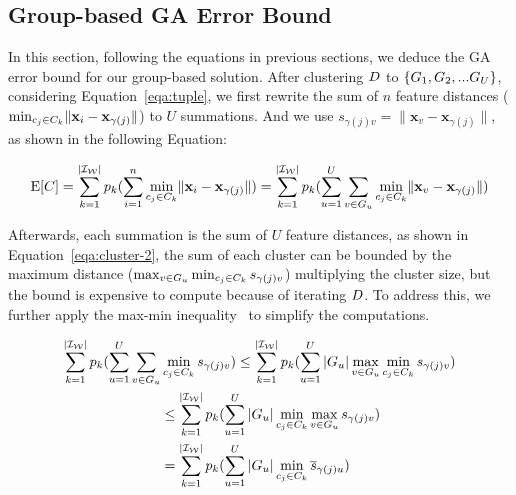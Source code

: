 




\subsection{Group-based GA Error Bound}
\label{group-ea}

In this section, following the equations in previous sections, we deduce the GA error bound for our group-based solution. 
%
After clustering $D$ to $\{ G_1 , G_2, ...G_U\}$, considering Equation~\ref{eqa:tuple}, we  first rewrite the sum of $n$ feature distances (\ie $\min_{c_j\in C_k}\lVert\mathbf{x}_i - \mathbf{x}_{\gamma(j)}\rVert$) to $U$ summations. And we use $s_{\gamma(j)v} = \lVert\mathbf{x}_v - \mathbf{x}_{\gamma(j)}\rVert$, as shown in the following Equation:

\begin{equation}\label{eqa:cluster-1}
    \mathrm{E}[C] = \sum_{k= 1}^{|\mathcal{I_W}|} p_k (\sum_{i=1}^n \min_{c_j\in C_k}\lVert\mathbf{x}_i - \mathbf{x}_{\gamma(j)}\rVert) =  \sum_{k= 1}^{|\mathcal{I_W}|} p_k (\sum_{u=1}^U\sum_{v \in G_u} \min_{c_j\in C_k}\lVert\mathbf{x}_v - \mathbf{x}_{\gamma(j)}\rVert)
\end{equation}

Afterwards, each summation is the sum of $U$ feature distances, as shown in Equation~\ref{eqa:cluster-2},  the sum of each cluster can be bounded by  the maximum distance ($\max_{v \in G_u} \min_{c_j\in C_k} s_{\gamma(j)v}$)  multiplying the  cluster size, but the bound is expensive to compute because of iterating $D$. To address this, we further apply the max-min inequality~\cite{boyd2004convex} to simplify the computations. 


\begin{equation}\label{eqa:cluster-2}
    \begin{aligned}
        \sum_{k= 1}^{|\mathcal{I_W}|} p_k (\sum_{u=1}^U\sum_{v \in G_u} & \min_{c_j\in C_k} s_{\gamma(j)v}) \leq \sum_{k= 1}^{|\mathcal{I_W}|} p_k (\sum_{u=1}^U |G_u| \max_{v \in G_u} \min_{c_j\in C_k}s_{\gamma(j)v}) \\
        & \leq \sum_{k= 1}^{|\mathcal{I_W}|} p_k (\sum_{u=1}^U |G_u| \min_{c_j\in C_k} \max_{v \in G_u}s_{\gamma(j)v}) \\
        & =  \sum_{k= 1}^{|\mathcal{I_W}|} p_k (\sum_{u=1}^U |G_u| \min_{c_j\in C_k} \overline{s}_{\gamma(j)u})
    \end{aligned}
\end{equation}



